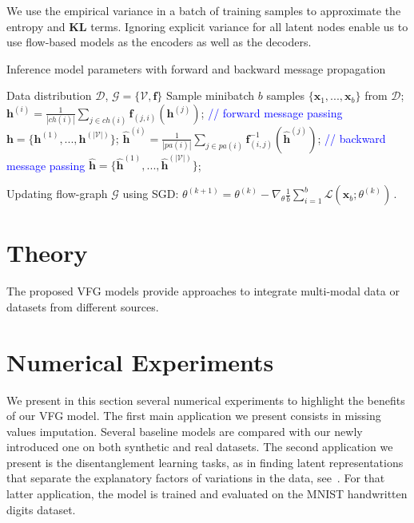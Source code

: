\documentclass{article} %
\newcommand{\belhal}[1]{{\color{red}{\bf\sf [BK: #1]}}}
\begin{document}
\belhal{To Improve. We should add a paragraph on implementation and ELBO/gradient computation} 
We use the empirical variance in a batch of training samples to approximate the entropy and \textbf{KL} terms. 
\belhal{KL  term between Gaussian priors is tractable, why do we approximate it?}
Ignoring  explicit variance  for all latent nodes enable us to use flow-based models as the encoders as well as the decoders. 





\begin{algorithm}[H]
   \caption{Inference model parameters with  forward and backward message propagation}
   \label{alg:main}
\begin{algorithmic}[1]
    Data distribution $\mathcal{D}$,  $\mathcal{G} = \{\mathcal{V}, \mathbf{f}\}$
   \STATE  Sample minibatch $b$ samples $\{\mathbf{x}_1, ..., \mathbf{x}_b \}$ from $\mathcal{D}$;
   \STATE $\mathbf{h}^{(i)} = \frac{1}{|ch(i)|} \sum_{j \in ch(i) } \mathbf{f}_{(j,i)}(\mathbf{h}^{(j)})$; \label{line:forward} \textcolor{blue}{// forward message passing}
   \ENDFOR
    \STATE  $\mathbf{h} =  \{\mathbf{h}^{(1)}, ...,  \mathbf{h}^{(|\mathcal{V}|)}  \}$;
   \STATE $\widehat{\mathbf{h}}^{(i)} = \frac{1}{|pa(i)|} \sum_{j \in pa(i) } \mathbf{f}^{-1}_{ (i,j)}(\widehat{\mathbf{h}}^{(j)}) $;\label{line:backward}  \textcolor{blue}{// backward message passing}
   \ENDFOR
    \STATE  $ \widehat{\mathbf{h}} =  \{\widehat{\mathbf{h}}^{(1)}, ...,  \widehat{\mathbf{h}}^{(|\mathcal{V}|)}  \}$;
    
    \STATE Updating flow-graph $\mathcal{G}$ using SGD: $\theta^{(k+1)} = \theta^{(k)} -  \nabla_{\theta}\frac{1}{b} \sum_{i=1}^b  \mathcal{L}(\mathbf{x}_b; \theta^{(k)})   \, .$
   \ENDFOR
\end{algorithmic}
\end{algorithm}




\section{Theory}\label{sec:theory}
The proposed VFG models provide approaches to integrate multi-modal data or datasets from different sources. 

\section{Numerical Experiments}\label{sec:numerical}
We present in this section several numerical experiments to highlight the benefits of our VFG model.
The first main application we present consists in missing values imputation. Several baseline models are compared with our newly introduced one on both synthetic and real datasets.
The second application we present is the disentanglement learning tasks, as in finding latent representations that separate the explanatory factors of variations in the data, see~\citet{bengio2013representation}.
For that latter application, the model is trained and evaluated on the MNIST handwritten digits dataset.
\end{document}
